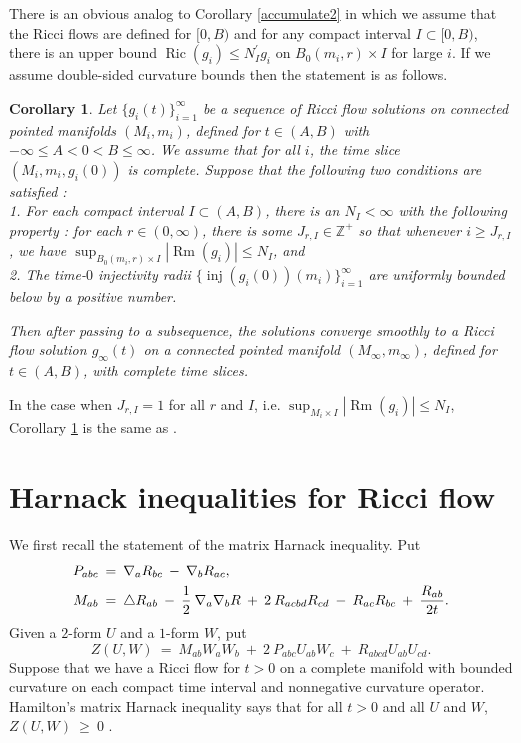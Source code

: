 \documentclass[12pt]{amsart}
\newcommand{\inj}{\operatorname{inj}}
\newcommand{\Ric}{\operatorname{Ric}}
\newcommand{\Rm}{\operatorname{Rm}}
\newcommand{\Z}{{\mathbb Z}}
\numberwithin{equation}{section}
\theoremstyle{plain}
\newtheorem{corollary}[equation]{Corollary}
\theoremstyle{definition}
\theoremstyle{remark}
\begin{document}
There is an obvious analog to Corollary \ref{accumulate2} in
which we assume that the Ricci flows are defined for $[0, B)$ and 
for any compact interval $I \subset [0, B)$, 
there is an upper bound $\Ric(g_i) \le N^\prime_I g_i$
on $B_0(m_i, r) \times I$ for large $i$.
If we assume double-sided curvature bounds 
then the statement is as follows.

\begin{corollary}
\label{accumulate3}
Let $\{g_i(t)\}_{i=1}^\infty$ be a sequence of Ricci flow solutions
on connected pointed manifolds $(M_i, m_i)$, 
defined for $t \in (A, B)$ with $-\infty \le A < 0 < B \le \infty$.
We assume that for all $i$, the time slice
$(M_i, m_i, g_i(0))$ is complete.
Suppose that the following
two conditions are satisfied : \\
1. For each compact interval $I \subset (A,B)$, 
there is an $N_{I} < \infty$ with the following property :
for each $r \in (0, \infty)$, there is some $J_{r,I} \in \Z^+$
so that whenever $i \ge J_{r,I}$, we have
$\sup_{B_0(m_i, r) \times I} |\Rm(g_i)| \le N_{I}$, and \\
2. The
time-$0$ injectivity radii 
$\{\inj(g_i(0))(m_i)\}_{i=1}^\infty$ 
are uniformly bounded below by a positive number.

Then after passing to a subsequence, the solutions converge smoothly
to a
Ricci flow solution $g_\infty(t)$ on a connected pointed manifold
$(M_\infty, m_\infty)$, defined for
$t \in (A, B)$, with complete time slices.
\end{corollary}

In the case when $J_{r,I} = 1$ for all $r$ and $I$,
i.e. $\sup_{M_i \times I} |\Rm(g_i)| \le N_{I}$,
Corollary \ref{accumulate3} is the same as
\cite[Main Theorem]{Hamiltonnn}.

\section{Harnack inequalities for Ricci flow} \label{appharnack}

We first recall the statement of the matrix Harnack inequality.
Put 
\begin{align}
P_{abc} \: & = \: \nabla_a R_{bc} \: - \: \nabla_b R_{ac}, \\
M_{ab} \: & = \: \triangle R_{ab} \: - \: \frac12 \: \nabla_a \nabla_b
R \: + \: 2 \: R_{acbd} R_{cd} \: - \: R_{ac} R_{bc} \: + \:
\frac{R_{ab}}{2t}. \notag
\end{align}
Given a $2$-form $U$ and a $1$-form $W$, put
\begin{equation}
Z(U, W) \: = \: M_{ab} W_a W_b \: + \: 2 \: P_{abc} U_{ab} W_c
\: + \: R_{abcd} U_{ab} U_{cd}.
\end{equation}
Suppose that we have a Ricci flow for $t > 0$ 
on a complete manifold with bounded
curvature on each 
compact time interval
and nonnegative curvature operator.
Hamilton's matrix Harnack inequality says that for all $t > 0$ and all
$U$ and $W$, $Z(U, W) \: \ge \: 0$ \cite[Theorem 14.1]{Hamilton}.
\end{document}
